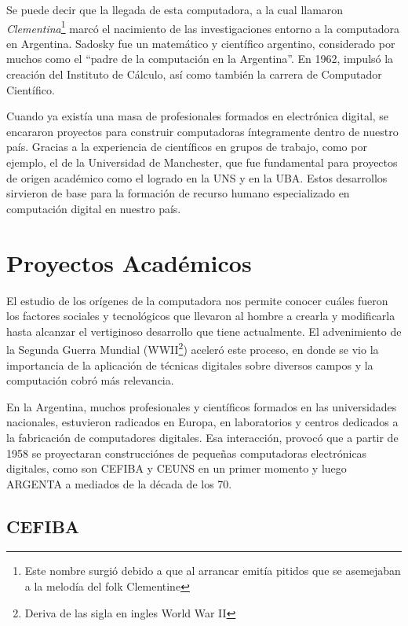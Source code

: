 \documentclass[%
  	final,
%
	notitlepage,
	narroweqnarray,
	inline,
 	twoside,
	]{ieee}
\begin{document}
Se puede decir que la llegada de esta computadora, a la cual llamaron \textit{Clementina}\footnote{Este nombre surgi\'o debido a que al arrancar emit\'ia pitidos que se asemejaban a la melod\'ia del folk Clementine} marc\'o el nacimiento de las investigaciones entorno a la computadora en Argentina.
Sadosky fue un matem\'atico y cient\'ifico argentino, considerado por muchos como el ``padre de la computaci\'on en la Argentina''.
En 1962, impuls\'o la creaci\'on del Instituto de C\'alculo, as\'i como tambi\'en la carrera de Computador Cient\'ifico.

Cuando ya exist\'ia una masa de profesionales formados en electr\'onica digital, se encararon proyectos para construir computadoras \'integramente dentro de nuestro pa\'is. Gracias a la experiencia de cient\'ificos en grupos de trabajo, como por ejemplo, el de la Universidad de Manchester, que fue fundamental para proyectos de origen acad\'emico como el logrado en la UNS y en la UBA. Estos desarrollos sirvieron de base para la formaci\'on de recurso humano especializado en computaci\'on digital en nuestro pa\'is.

\section{Proyectos Acad\'emicos}

El estudio de los or\'igenes de la computadora nos permite conocer cu\'ales fueron los factores sociales y tecnol\'ogicos que llevaron al hombre a crearla y modificarla hasta alcanzar el vertiginoso desarrollo que tiene actualmente. El advenimiento de la Segunda Guerra Mundial (WWII\footnote{Deriva de las sigla en ingles World War II}) aceler\'o este proceso, en donde se vio la importancia de la aplicaci\'on de t\'ecnicas digitales sobre diversos campos y la computaci\'on cobr\'o m\'as relevancia.

En la Argentina, muchos profesionales y cient\'ificos formados en las universidades nacionales, estuvieron radicados en Europa, en laboratorios y centros dedicados a la fabricaci\'on de computadores digitales. Esa interacci\'on, provoc\'o que a partir de 1958 se proyectaran construcci\'ones de peque\~nas computadoras electr\'onicas digitales, como son CEFIBA y CEUNS en un primer momento y luego ARGENTA a mediados de la d\'ecada de los 70.

\subsection*{CEFIBA}
\end{document}
